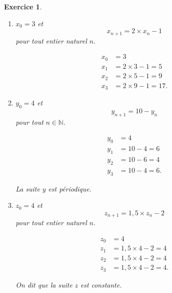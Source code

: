 \documentclass[10pt]{article}
\newtheorem{exo}{Exercice}
\begin{document}
\begin{exo}
\begin{enumerate}
\item $x_0=3$ et \[x_{n+1}=2\times x_n-1\] pour tout entier naturel $n.$

\begin{align*}
x_0&=3\\
x_1&=2\times 3-1=5\\
x_2&=2\times 5-1=9\\
x_3&=2\times 9-1=17.\end{align*}


\item $y_0=4$ et \[y_{n+1}=10-y_n\] pour tout $n\in\mathbb{N}.$

\begin{align*}
y_0&=4\\
y_1&=10-4=6\\
y_2&=10-6=4\\
y_3&=10-4=6.\end{align*}

\medskip

La suite $y$ est périodique.

\item $z_0=4$ et \[z_{n+1}=1,5\times z_n-2\] pour tout entier naturel $n.$

\begin{align*}
z_0&=4\\
z_1&=1,5\times 4-2=4\\
z_2&=1,5\times 4-2=4\\
z_3&=1,5\times 4-2=4.\end{align*}

On dit que la suite $z$ est constante.
\end{enumerate}
\end{exo}
\end{document}
